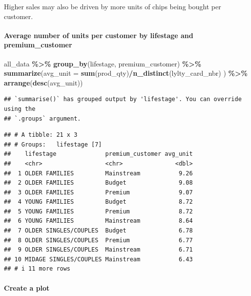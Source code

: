 \documentclass[
]{article}
\newenvironment{Shaded}{\begin{snugshade}}{\end{snugshade}}
\newcommand{\AttributeTok}[1]{\textcolor[rgb]{0.13,0.29,0.53}{#1}}
\newcommand{\FunctionTok}[1]{\textcolor[rgb]{0.13,0.29,0.53}{\textbf{#1}}}
\newcommand{\NormalTok}[1]{#1}
\newcommand{\SpecialCharTok}[1]{\textcolor[rgb]{0.81,0.36,0.00}{\textbf{#1}}}
\begin{document}
Higher sales may also be driven by more units of chips being bought per
customer.

\hypertarget{average-number-of-units-per-customer-by-lifestage-and-premium_customer}{%
\paragraph{Average number of units per customer by lifestage and
premium\_customer}\label{average-number-of-units-per-customer-by-lifestage-and-premium_customer}}

\begin{Shaded}
\begin{Highlighting}[]
\NormalTok{all\_data }\SpecialCharTok{\%\textgreater{}\%}
  \FunctionTok{group\_by}\NormalTok{(lifestage, premium\_customer) }\SpecialCharTok{\%\textgreater{}\%}
  \FunctionTok{summarize}\NormalTok{(}\AttributeTok{avg\_unit =} \FunctionTok{sum}\NormalTok{(prod\_qty)}\SpecialCharTok{/}\FunctionTok{n\_distinct}\NormalTok{(lylty\_card\_nbr) ) }\SpecialCharTok{\%\textgreater{}\%}
  \FunctionTok{arrange}\NormalTok{(}\FunctionTok{desc}\NormalTok{(avg\_unit))}
\end{Highlighting}
\end{Shaded}

\begin{verbatim}
## `summarise()` has grouped output by 'lifestage'. You can override using the
## `.groups` argument.
\end{verbatim}

\begin{verbatim}
## # A tibble: 21 x 3
## # Groups:   lifestage [7]
##    lifestage              premium_customer avg_unit
##    <chr>                  <chr>               <dbl>
##  1 OLDER FAMILIES         Mainstream           9.26
##  2 OLDER FAMILIES         Budget               9.08
##  3 OLDER FAMILIES         Premium              9.07
##  4 YOUNG FAMILIES         Budget               8.72
##  5 YOUNG FAMILIES         Premium              8.72
##  6 YOUNG FAMILIES         Mainstream           8.64
##  7 OLDER SINGLES/COUPLES  Budget               6.78
##  8 OLDER SINGLES/COUPLES  Premium              6.77
##  9 OLDER SINGLES/COUPLES  Mainstream           6.71
## 10 MIDAGE SINGLES/COUPLES Mainstream           6.43
## # i 11 more rows
\end{verbatim}

\hypertarget{create-a-plot-2}{%
\paragraph{Create a plot}\label{create-a-plot-2}}
\end{document}
